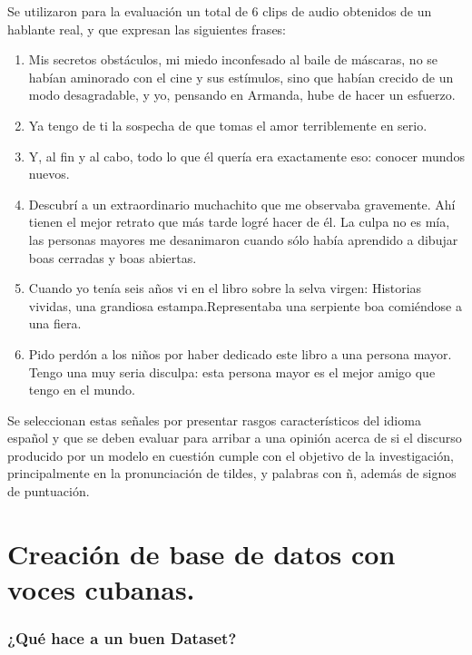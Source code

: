 Se utilizaron para la evaluación un total de 6 clips de audio obtenidos de un hablante real, y que expresan las siguientes frases:
\begin{enumerate}
	\item Mis secretos obstáculos, mi miedo inconfesado al baile de máscaras, no se habían aminorado con el cine y sus estímulos, sino que habían crecido de un modo desagradable, y yo, pensando en Armanda, hube de hacer un esfuerzo. \label{sentence1}
	\item Ya tengo de ti la sospecha de que tomas el amor terriblemente en serio. \label{sentence2}
	\item Y, al fin y al cabo, todo lo que él quería era exactamente eso: conocer mundos nuevos. \label{sentence3}
	\item Descubrí a un extraordinario muchachito que me observaba gravemente. Ahí tienen el mejor retrato que más tarde logré hacer de él. La culpa no es mía, las personas mayores me desanimaron cuando sólo había aprendido a dibujar boas cerradas y boas abiertas. \label{sentence4}
	\item Cuando yo tenía seis años vi en el libro sobre la selva virgen: Historias vividas, una grandiosa estampa.Representaba una serpiente boa comiéndose a una fiera. \label{sentence5}
	\item Pido perdón a los niños por haber dedicado este libro a una persona mayor. Tengo una muy seria disculpa: esta persona mayor es el mejor amigo que tengo en el mundo. \label{sentence6}
\end{enumerate}

Se seleccionan estas señales por presentar rasgos característicos del idioma español y que se deben evaluar para arribar a una opinión acerca de si el discurso producido por un modelo en cuestión cumple con el objetivo de la investigación, principalmente en la pronunciación de tildes, y palabras con ñ, además de signos de puntuación.  



\section{Creación de base de datos con voces cubanas.}

\subsubsection{¿Qué hace a un buen Dataset?}

